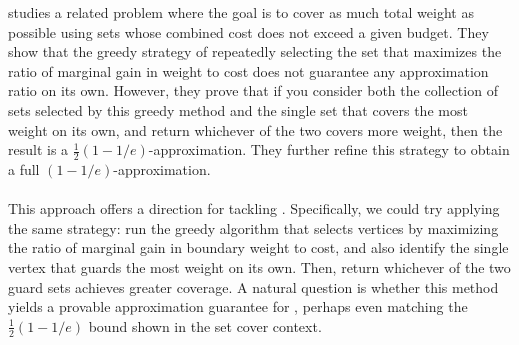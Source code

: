 \cite{khuller} studies a related problem where the goal is to cover as much total weight as possible using sets whose combined cost does not exceed a given budget. They show that the greedy strategy of repeatedly selecting the set that maximizes the ratio of marginal gain in weight to cost does not guarantee any approximation ratio on its own. However, they prove that if you consider both the collection of sets selected by this greedy method and the single set that covers the most weight on its own, and return whichever of the two covers more weight, then the result is a $\frac{1}{2}(1-1/e)$-approximation. They further refine this strategy to obtain a full $(1-1/e)$-approximation.\\\\
This approach offers a direction for tackling \BMVVG{}. Specifically, we could try applying the same strategy: run the greedy algorithm that selects vertices by maximizing the ratio of marginal gain in boundary weight to cost, and also identify the single vertex that guards the most weight on its own. Then, return whichever of the two guard sets achieves greater coverage. A natural question is whether this method yields a provable approximation guarantee for \BMVVG{}, perhaps even matching the $\frac{1}{2}(1-1/e)$ bound shown in the set cover context.